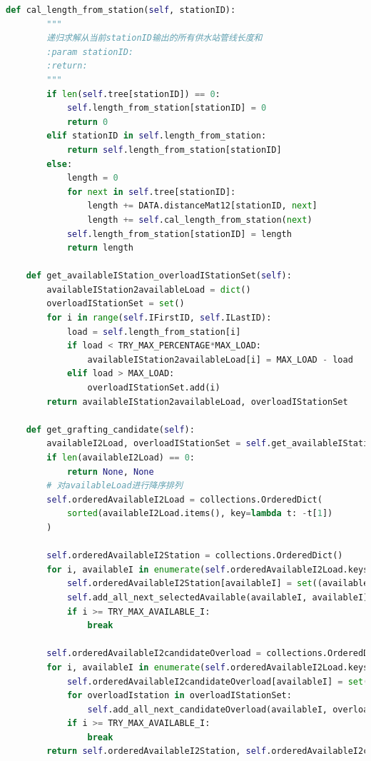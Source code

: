 \documentclass{cumcmthesis}
\begin{document}
\begin{appendices}
\begin{lstlisting}[language=python]
    def cal_length_from_station(self, stationID):
        """
        递归求解从当前stationID输出的所有供水站管线长度和
        :param stationID:
        :return:
        """
        if len(self.tree[stationID]) == 0:
            self.length_from_station[stationID] = 0
            return 0
        elif stationID in self.length_from_station:
            return self.length_from_station[stationID]
        else:
            length = 0
            for next in self.tree[stationID]:
                length += DATA.distanceMat12[stationID, next]
                length += self.cal_length_from_station(next)
            self.length_from_station[stationID] = length
            return length

    def get_availableIStation_overloadIStationSet(self):
        availableIStation2availableLoad = dict()
        overloadIStationSet = set()
        for i in range(self.IFirstID, self.ILastID):
            load = self.length_from_station[i]
            if load < TRY_MAX_PERCENTAGE*MAX_LOAD:
                availableIStation2availableLoad[i] = MAX_LOAD - load
            elif load > MAX_LOAD:
                overloadIStationSet.add(i)
        return availableIStation2availableLoad, overloadIStationSet

    def get_grafting_candidate(self):
        availableI2Load, overloadIStationSet = self.get_availableIStation_overloadIStationSet()
        if len(availableI2Load) == 0:
            return None, None
        # 对availableLoad进行降序排列
        self.orderedAvailableI2Load = collections.OrderedDict(
            sorted(availableI2Load.items(), key=lambda t: -t[1])
        )

        self.orderedAvailableI2Station = collections.OrderedDict()
        for i, availableI in enumerate(self.orderedAvailableI2Load.keys()):
            self.orderedAvailableI2Station[availableI] = set((availableI,))
            self.add_all_next_selectedAvailable(availableI, availableI)
            if i >= TRY_MAX_AVAILABLE_I:
                break

        self.orderedAvailableI2candidateOverload = collections.OrderedDict()
        for i, availableI in enumerate(self.orderedAvailableI2Load.keys()):
            self.orderedAvailableI2candidateOverload[availableI] = set()
            for overloadIstation in overloadIStationSet:
                self.add_all_next_candidateOverload(availableI, overloadIstation)
            if i >= TRY_MAX_AVAILABLE_I:
                break
        return self.orderedAvailableI2Station, self.orderedAvailableI2candidateOverload


\end{lstlisting}
\end{appendices}
\end{document}
